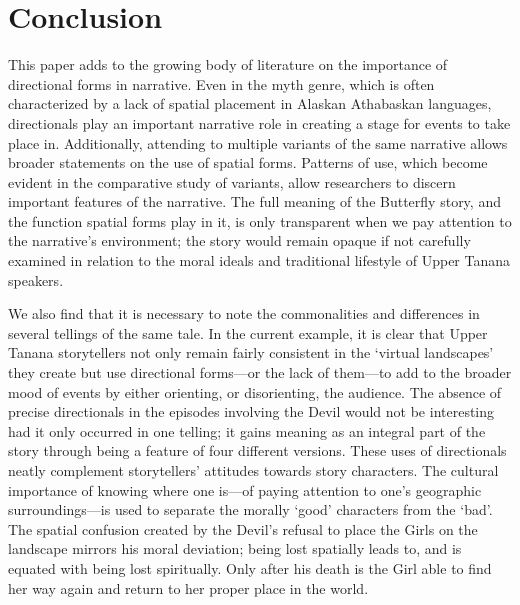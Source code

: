 \section{Conclusion}
\label{brucks:section:conclusion}

This paper adds to the growing body of literature on the importance of directional forms in narrative. Even in the myth genre, which is often characterized by a lack of spatial placement in Alaskan Athabaskan languages, directionals play an important narrative role in creating a stage for events to take place in. Additionally, attending to multiple variants of the same narrative allows broader statements on the use of spatial forms. Patterns of use, which become evident in the comparative study of variants, allow researchers to discern important features of the narrative. The full meaning of the Butterfly story, and the function spatial forms play in it, is only transparent when we pay attention to the narrative's environment; the story would remain opaque if not carefully examined in relation to the moral ideals and traditional lifestyle of Upper Tanana speakers.

We also find that it is necessary to note the commonalities and differences in several tellings of the same tale. In the current example, it is clear that Upper Tanana storytellers not only remain fairly consistent in the `virtual landscapes' they create but use directional forms—or the lack of them—to add to the broader mood of events by either orienting, or disorienting, the audience. The absence of precise directionals in the episodes involving the Devil would not be interesting had it only occurred in one telling; it gains meaning as an integral part of the story through being a feature of four different versions. These uses of directionals neatly complement storytellers' attitudes towards story characters. The cultural importance of knowing where one is—of paying attention to one's geographic surroundings—is used to separate the morally `good' characters from the `bad'. The spatial confusion created by the Devil's refusal to place the Girls on the landscape mirrors his moral deviation; being lost spatially leads to, and is equated with being lost spiritually. Only after his death is the Girl able to find her way again and return to her proper place in the world.





\label{brucks:brucks-ch-end}
